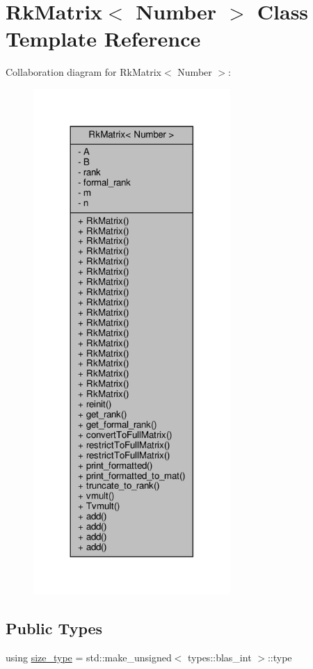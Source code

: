\hypertarget{classRkMatrix}{}\section{Rk\+Matrix$<$ Number $>$ Class Template Reference}
\label{classRkMatrix}


Collaboration diagram for Rk\+Matrix$<$ Number $>$\+:\nopagebreak
\begin{figure}[H]
\begin{center}
\leavevmode
\includegraphics[width=212pt]{classRkMatrix__coll__graph}
\end{center}
\end{figure}
\subsection*{Public Types}
\begin{DoxyCompactItemize}
\item 
using \hyperlink{classRkMatrix_add060bfc3a4cc77f858c3d6dd58cadd5}{size\+\_\+type} = std\+::make\+\_\+unsigned$<$ types\+::blas\+\_\+int $>$\+::type
\end{DoxyCompactItemize}
